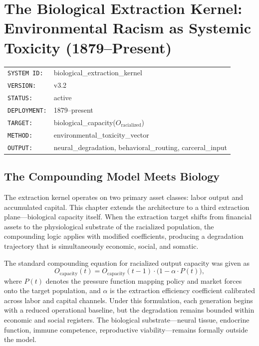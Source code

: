 \providecommand{\SourceNote}[1]{\footnote{#1}}

\chapter{The Biological Extraction Kernel: Environmental Racism as Systemic Toxicity (1879--Present)}
\label{ch:environmental_racism}

\begin{tcolorbox}[colback=black!5!white,colframe=black!75!white,title=RUNTIME LOG: biological\_extraction\_kernel]
\begin{tabular}{ll}
\texttt{SYSTEM ID:} & biological\_extraction\_kernel \\
\texttt{VERSION:} & v3.2 \\
\texttt{STATUS:} & active \\
\texttt{DEPLOYMENT:} & 1879--present \\
\texttt{TARGET:} & biological\_capacity($O_{\text{racialized}}$) \\
\texttt{METHOD:} & environmental\_toxicity\_vector \\
\texttt{OUTPUT:} & neural\_degradation, behavioral\_routing, carceral\_input
\end{tabular}
\end{tcolorbox}

\section{The Compounding Model Meets Biology}

The extraction kernel operates on two primary asset classes: labor output and
accumulated capital. This chapter extends the architecture to a third extraction
plane---biological capacity itself. When the extraction target shifts from
financial assets to the physiological substrate of the racialized population, the
compounding logic applies with modified coefficients, producing a degradation
trajectory that is simultaneously economic, social, and somatic.

The standard compounding equation for racialized output capacity was given as
\begin{equation}
O_{\text{capacity}}(t) = O_{\text{capacity}}(t-1) \cdot \bigl(1 - \alpha \cdot P(t)\bigr),
\label{eq:capacity-compound}
\end{equation}
where $P(t)$ denotes the pressure function mapping policy and market forces onto
the target population, and $\alpha$ is the extraction efficiency coefficient
calibrated across labor and capital channels. Under this formulation, each
generation begins with a reduced operational baseline, but the degradation
remains bounded within economic and social registers. The biological
substrate---neural tissue, endocrine function, immune competence, reproductive
viability---remains formally outside the model.

